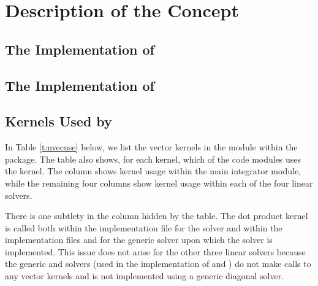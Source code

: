 \section{Description of the {\nvector} Concept}\label{s:nvector}


\subsection{The {\nvecs} Implementation of {\nvector}}\label{ss:nvec_ser}


\subsection{The {\nvecp} Implementation of {\nvector}}\label{ss:nvec_par}


\subsection{{\nvector} Kernels Used by {\cvode}}

In Table \ref{t:nvecuse} below, we list the vector kernels in the 
{\nvector} module within the {\cvode} package.
The table also shows, for each kernel, which of the code modules uses
the kernel. The {\cvode} column shows kernel usage within the main
integrator module, while the remaining four columns show kernel usage
within each of the four {\cvode} linear solvers. 

There is one subtlety in the {\cvspgmr} column hidden by the table. 
The dot product kernel  is called both within the 
implementation file  for the {\cvspgmr} solver and within 
the implementation files  and  for the generic {\spgmr} 
solver upon which the {\cvspgmr} solver is implemented. 
This issue does not arise for the other 
three {\cvode} linear solvers because the generic {\dense} and {\band} solvers 
(used in the implementation of {\cvdense} and {\cvband}) do not make calls to 
any vector kernels and {\cvdiag} is not implemented using a generic diagonal solver. 

